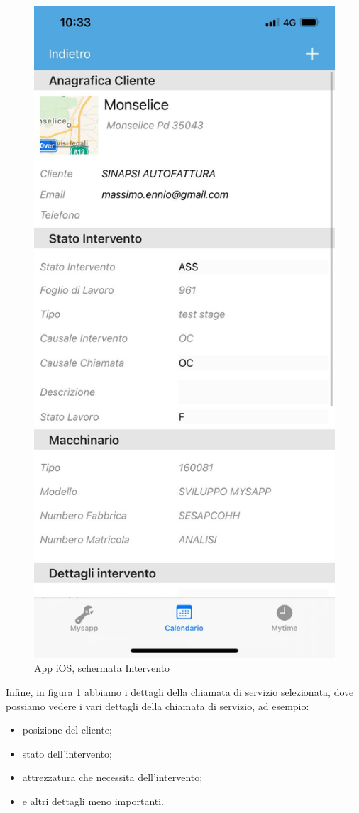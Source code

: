 \begin{figure}[!h] 
	\centering 
	\includegraphics[scale = 0.2]{immagini/app iOS/intervento-iOS.jpeg} 
	\caption {App iOS, schermata Intervento}
	\label{fig:2-17}
\end{figure}
Infine, in figura \ref{fig:2-17} abbiamo i dettagli della chiamata di servizio selezionata, dove possiamo vedere i vari dettagli della chiamata di servizio, ad esempio:
\begin{itemize}
	\item posizione del cliente;
	\item stato dell'intervento;
	\item attrezzatura che necessita dell'intervento;
	\item e altri dettagli meno importanti.
\end{itemize}
\newpage
